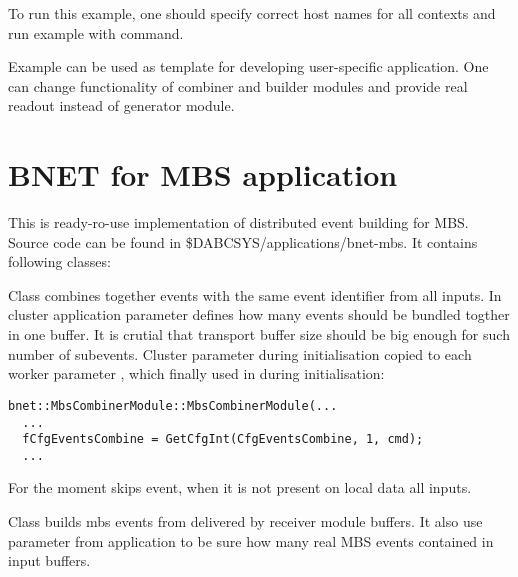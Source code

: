 To run this example, one should specify correct host names for all contexts and 
run example with  command.      

Example can be used as template for developing user-specific application.
One can change functionality of combiner and builder modules and provide 
real readout instead of generator module. 


\section{BNET for MBS application}

This is ready-ro-use implementation of distributed event building for MBS.
Source code can be found in \$DABCSYS/applications/bnet-mbs. It contains following
classes:
\bbul
\item  {}
\item  {}
\item  {}
\item  {}
\ebul

Class  combines together  
events with the same event identifier from all inputs. 
In cluster application parameter  defines how many
events should be bundled togther in one buffer. It is crutial that transport
buffer size should be big enough for such number of subevents. 
Cluster parameter  during initialisation copied to each
worker parameter , which finally used in 
during initialisation: 
   
\begin{small}
\begin{verbatim}
bnet::MbsCombinerModule::MbsCombinerModule(...  
  ...
  fCfgEventsCombine = GetCfgInt(CfgEventsCombine, 1, cmd);
  ...
\end{verbatim}
\end{small}

For the moment  skips event, 
when it is not present on local data all inputs. 

Class  builds mbs events from 
delivered by receiver module buffers. It also use parameter
 from application to be sure how many real MBS events
contained in input buffers.
  
